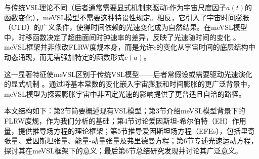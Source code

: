\documentclass[jkps,preprint,fleqn]{revtex4}
\newcommand{\tc}{\tilde{c}}
\begin{document}
\begin{CJK*}{UTF8}{gbsn}
与传统VSL理论不同（后者通常需要显式机制来驱动$\tc$作为宇宙尺度因子$a(t)$的函数变化），meVSL模型不需要这种特设性规定。相反，它引入了宇宙时间膨胀（CTD）的广义条件，使得时间依赖的光速变化成为自然结果。在meVSL模型中，时移函数决定了超曲面间时钟速率的差异，反映了光速随时间的变化 \cite{Lee:2024zcu}。meVSL框架并非修改FLRW度规本身，而是允许$\tc$的变化从宇宙时间的底层结构中动态涌现，而无需强加特定的函数形式$\tc(a)$。

这一显著特征使meVSL区别于传统VSL模型——后者常假设或需要驱动光速演化的显式机制 \cite{Avelino:1999is,Belinchon:1999kq,Avelino:2000ph,Szydlowski:2002kz,Magueijo:2003gj,Shojaie:2004sq,Shojaie:2004xw,Balcerzak:2013kha,Balcerzak:2014rga,Franzmann:2017nsc,Hanimeli:2019wrt,Skara:2019usd,Bhattacharjee:2020fgl,Gupta:2020anq,Cuzinatto:2022mfe,Cuzinatto:2022vvy,Cuzinatto:2022dta,Bileska:2024odt,Coleman:1997xq,Albrecht:1998ir,Barrow:1998df,Barrow:1999is,Bassett:2000wj,Jacobson:2000xp,Magueijo:2000zt,Clayton:1998hv,Drummond:1999ut,Clayton:1999zs,Liberati:2000us,Clayton:2000xt,Drummond:2001rj,Amelino-Camelia:1996bln,Amelino-Camelia:1997ieq,Ellis:1999sd,Amelino-Camelia:2000bxx,Amelino-Camelia:2000cpa,Ellis:2000sf,Kowalski-Glikman:2001vvk,Bruno:2001mw,Magueijo:2001cr,Amelino-Camelia:2002uql,Magueijo:2002pg,Moffat:1992ud,Manida:1999rx,Barrow:1999st,Stepanov:1999ax,Magueijo:2000au,Moffat:2002nm,Kaelbermann:1998hu,Randall:1999ee,Randall:1999vf,Kiritsis:1999tx,Chung:1999xg,Alexander:1999cb,Ishihara:2000nf,Csaki:2000dm,Youm:2001sw,Youm:2001zk,Grojean:2001pv,Youm:2001zp,Drummond:1979pp,Novello:1988ma,Barton:1989dq,Scharnhorst:1990sr,Shore:1995fz,Colladay:1995qb,Coleman:1998ti,Bertolami:1999da,Shore:2000bs,Greenberg:2002uu,Teyssandier:2003qh,Shore:2003zc,Blasone:2003wf,Alexander:2001dr,Burgess:2002tb}。通过将基本常数的变化嵌入宇宙膨胀和时间膨胀的更广泛背景中，meVSL模型为探索膨胀宇宙中非固定光速的影响提供了更普适且自洽的路径。

本文结构如下：第2节简要概述现有VSL模型；第3节介绍meVSL模型背景下的FLRW度规，作为我们分析的基础；第4节讨论爱因斯坦-希尔伯特（EH）作用量，提供推导场方程的理论框架；第5节推导爱因斯坦场方程（EFEs），包括里奇张量、爱因斯坦张量、能量-动量张量及弗里德曼方程；第6节专述光速运动方程，探讨其在meVSL框架下的意义；最后第6节总结研究发现并讨论其广泛意义。

\end{CJK*}
\end{document}

